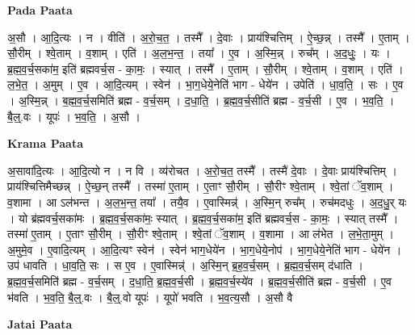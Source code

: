 \documentclass[17pt]{extarticle}
\begin{document}
\textbf{Pada Paata} \newline

अ॒सौ । आ॒दि॒त्यः । न । वीति॑ । अ॒रो॒च॒त॒ । तस्मै᳚ । दे॒वाः । प्राय॑श्चित्तिम् । ऐ॒च्छ॒न्न् । तस्मै᳚ । ए॒ताम् । सौ॒रीम् । श्वे॒ताम् । व॒शाम् । एति॑ । अ॒ल॒भ॒न्त॒ । तया᳚ । ए॒व । अ॒स्मि॒न्न् । रुच᳚म् । अ॒द॒धुः॒ । यः । ब्र॒ह्म॒व॒र्च॒सका॑म॒ इति॑ ब्रह्मवर्च॒स - का॒मः॒ । स्यात् । तस्मै᳚ । ए॒ताम् । सौ॒रीम् । श्वे॒ताम् । व॒शाम् । एति॑ । ल॒भे॒त॒ । अ॒मुम् । ए॒व । आ॒दि॒त्यम् । स्वेन॑ । भा॒ग॒धेये॒नेति॑ भाग - धेये॑न । उपेति॑ । धा॒व॒ति॒ । सः । ए॒व । अ॒स्मि॒न्न् । ब॒ह्म॒व॒र्च॒समिति॑ ब्रह्म - व॒र्च॒सम् । द॒धा॒ति॒ । ब्र॒ह्म॒व॒र्च॒सीति॑ ब्रह्म - व॒र्च॒सी । ए॒व । भ॒व॒ति॒ । बै॒ल्॒.वः । यूपः॑ । भ॒व॒ति॒ । अ॒सौ ।  \newline


\textbf{Krama Paata} \newline

अ॒सावा॑दि॒त्यः । आ॒दि॒त्यो न । न वि । व्य॑रोचत । अ॒रो॒च॒त॒ तस्मै᳚ । तस्मै॑ दे॒वाः । दे॒वाः प्राय॑श्चित्तिम् । प्राय॑श्चित्तिमैच्छन्न् । ऐ॒च्छ॒न् तस्मै᳚ । तस्मा॑ ए॒ताम् । ए॒ताꣳ सौ॒रीम् । सौ॒रीꣳ श्वे॒ताम् । श्वे॒तां ॅव॒शाम् । व॒शामा । आ ऽल॑भन्त । अ॒ल॒भ॒न्त॒ तया᳚ । तयै॒व । ए॒वास्मिन्न्॑ । अ॒स्मि॒न् रुच᳚म् । रुच॑मदधुः । अ॒द॒धु॒र् यः । यो ब्र॑ह्मवर्च॒सका॑मः । ब्र॒ह्म॒व॒र्च॒सका॑मः॒ स्यात् । ब्र॒ह्म॒व॒र्च॒सका॑म॒ इति॑ ब्रह्मवर्च॒स - का॒मः॒ । स्यात् तस्मै᳚ । तस्मा॑ ए॒ताम् । ए॒ताꣳ सौ॒रीम् । सौ॒रीꣳ श्वे॒ताम् । श्वे॒तां ॅव॒शाम् । व॒शामा । आ ल॑भेत । ल॒भे॒ता॒मुम् । अ॒मुमे॒व । ए॒वादि॒त्यम् । आ॒दि॒त्यꣳ स्वेन॑ । स्वेन॑ भाग॒धेये॑न । भा॒ग॒धेये॒नोप॑ । भा॒ग॒धेये॒नेति॑ भाग - धेये॑न । उप॑ धावति । धा॒व॒ति॒ सः । स ए॒व । ए॒वास्मिन्न्॑ । अ॒स्मि॒न् ब्र॒ह॒व॒र्च॒सम् । ब्र॒ह्म॒व॒र्च॒सम् द॑धाति । ब्र॒ह्म॒व॒र्च॒समिति॑ ब्रह्म - व॒र्च॒सम् । द॒धा॒ति॒ ब्र॒ह्म॒व॒र्च॒सी । ब्र॒ह्म॒व॒र्च॒स्ये॑व । ब्र॒ह्म॒व॒र्च॒सीति॑ ब्रह्म - व॒र्च॒सी । ए॒व भ॑वति । भ॒व॒ति॒ बै॒ल्॒.वः । बै॒ल्॒.वो यूपः॑ । यूपो॑ भवति । भ॒व॒त्य॒सौ । अ॒सौ वै \newline

\textbf{Jatai Paata} \newline
\end{document}
